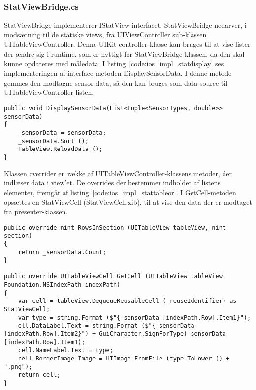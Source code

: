\subsubsection{StatViewBridge.cs}
StatViewBridge implementerer IStatView-interfacet. StatViewBridge nedarver, i modsætning til de statiske views, fra UIViewController sub-klassen UITableViewController. Denne UIKit controller-klasse kan bruges til at vise lister der ændre sig i runtime, som er nyttigt for StatViewBridge-klassen, da den skal kunne opdateres med måledata. I listing~\ref{code:ios_impl_statdisplay} ses implementeringen af interface-metoden DisplaySensorData. I denne metode gemmes den modtagne sensor data, så den kan bruges som data source til UITableViewController-listen.

\begin{lstlisting}[caption={DisplaySensorData(...)},label={code:ios_impl_statdisplay}]
public void DisplaySensorData(List<Tuple<SensorTypes, double>> sensorData)
{
	_sensorData = sensorData;
	_sensorData.Sort ();
	TableView.ReloadData ();
}
\end{lstlisting}

Klassen overrider en række af UITableViewController-klassens metoder, der indlæser data i view'et. De overrides der bestemmer indholdet af listens elementer, fremgår af listing~\ref{code:ios_impl_stattableor}. I GetCell-metoden opsættes en StatViewCell (StatViewCell.xib), til at vise den data der er modtaget fra presenter-klassen.

\begin{lstlisting}[caption={Overrides af UITableViewController-metoder i StatViewBridge},label={code:ios_impl_stattableor}]
public override nint RowsInSection (UITableView tableView, nint section)
{
	return _sensorData.Count;
}

public override UITableViewCell GetCell (UITableView tableView, Foundation.NSIndexPath indexPath)
{	
	var cell = tableView.DequeueReusableCell (_reuseIdentifier) as StatViewCell;
	var type = string.Format ($"{_sensorData [indexPath.Row].Item1}");
	ell.DataLabel.Text = string.Format ($"{_sensorData [indexPath.Row].Item2}") + GuiCharacter.SignForType(_sensorData [indexPath.Row].Item1);
	cell.NameLabel.Text = type;
	cell.BorderImage.Image = UIImage.FromFile (type.ToLower () + ".png");
	return cell;
}
\end{lstlisting}